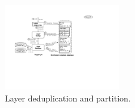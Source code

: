 
\begin{figure}[t]
	\centering
	\centering
	\includegraphics[width=0.45\textwidth]{graphs/sys-architecture-put-layer.pdf}
	\caption{Layer deduplication and partition.}
	\label{fig:dedup-partition}
\end{figure}




